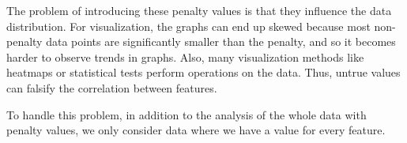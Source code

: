 The problem of introducing these penalty values is that they influence the data distribution.
For visualization, the graphs can end up skewed because most non-penalty data points are significantly smaller than the penalty, 
and so it becomes harder to observe trends in graphs. Also, many visualization methods like heatmaps or statistical tests perform operations on the
data. Thus, untrue values can falsify the correlation between features.

To handle this problem, in addition to the analysis of the whole data with penalty values, we only consider data where we have a value for every feature.